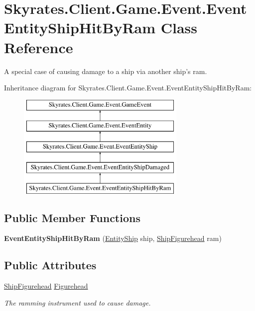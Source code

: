\hypertarget{class_skyrates_1_1_client_1_1_game_1_1_event_1_1_event_entity_ship_hit_by_ram}{\section{Skyrates.\-Client.\-Game.\-Event.\-Event\-Entity\-Ship\-Hit\-By\-Ram Class Reference}
\label{class_skyrates_1_1_client_1_1_game_1_1_event_1_1_event_entity_ship_hit_by_ram}
}


A special case of causing damage to a ship via another ship's ram.  


Inheritance diagram for Skyrates.\-Client.\-Game.\-Event.\-Event\-Entity\-Ship\-Hit\-By\-Ram\-:\begin{figure}[H]
\begin{center}
\leavevmode
\includegraphics[height=5.000000cm]{class_skyrates_1_1_client_1_1_game_1_1_event_1_1_event_entity_ship_hit_by_ram}
\end{center}
\end{figure}
\subsection*{Public Member Functions}
\begin{DoxyCompactItemize}
\item 
\hypertarget{class_skyrates_1_1_client_1_1_game_1_1_event_1_1_event_entity_ship_hit_by_ram_ad94fc2f7f3edfe005e00b18b7f8ade24}{{\bfseries Event\-Entity\-Ship\-Hit\-By\-Ram} (\hyperlink{class_skyrates_1_1_client_1_1_entity_1_1_entity_ship}{Entity\-Ship} ship, \hyperlink{class_skyrates_1_1_client_1_1_ship_1_1_ship_figurehead}{Ship\-Figurehead} ram)}\label{class_skyrates_1_1_client_1_1_game_1_1_event_1_1_event_entity_ship_hit_by_ram_ad94fc2f7f3edfe005e00b18b7f8ade24}

\end{DoxyCompactItemize}
\subsection*{Public Attributes}
\begin{DoxyCompactItemize}
\item 
\hyperlink{class_skyrates_1_1_client_1_1_ship_1_1_ship_figurehead}{Ship\-Figurehead} \hyperlink{class_skyrates_1_1_client_1_1_game_1_1_event_1_1_event_entity_ship_hit_by_ram_a139003403af668e386ef09085511a81c}{Figurehead}
\begin{DoxyCompactList}\small\item\em The ramming instrument used to cause damage. \end{DoxyCompactList}\end{DoxyCompactItemize}
